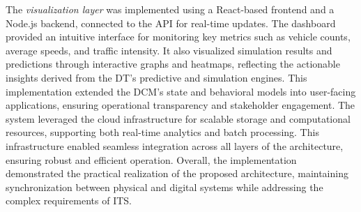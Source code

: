 The \textit{visualization layer} was implemented using a React-based frontend and a Node.js backend, connected to the API for real-time updates. The dashboard provided an intuitive interface for monitoring key metrics such as vehicle counts, average speeds, and traffic intensity. It also visualized simulation results and predictions through interactive graphs and heatmaps, reflecting the actionable insights derived from the DT's predictive and simulation engines. This implementation extended the DCM’s state and behavioral models into user-facing applications, ensuring operational transparency and stakeholder engagement. The system leveraged the cloud infrastructure for scalable storage and computational resources, supporting both real-time analytics and batch processing. This infrastructure enabled seamless integration across all layers of the architecture, ensuring robust and efficient operation. Overall, the implementation demonstrated the practical realization of the proposed architecture, maintaining synchronization between physical and digital systems while addressing the complex requirements of ITS.
